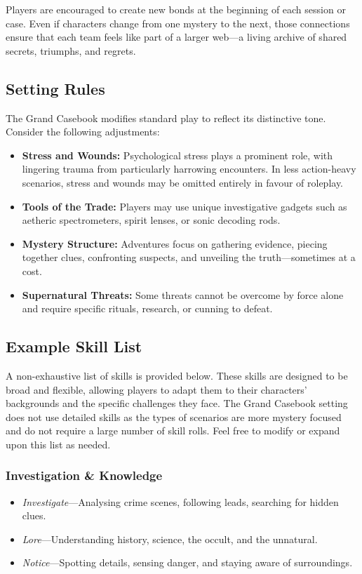 Players are encouraged to create new bonds at the beginning of each session or case. Even if characters change from one mystery to the next, those connections ensure that each team feels like part of a larger web—a living archive of shared secrets, triumphs, and regrets.

\subsection{Setting Rules}

The Grand Casebook modifies standard play to reflect its distinctive tone. Consider the following adjustments:

\begin{itemize}\raggedright
    \item \textbf{Stress and Wounds:} Psychological stress plays a prominent role, with lingering trauma from particularly harrowing encounters. In less action-heavy scenarios, stress and wounds may be omitted entirely in favour of roleplay.
    
    \item \textbf{Tools of the Trade:} Players may use unique investigative gadgets such as aetheric spectrometers, spirit lenses, or sonic decoding rods.
    
    \item \textbf{Mystery Structure:} Adventures focus on gathering evidence, piecing together clues, confronting suspects, and unveiling the truth—sometimes at a cost.
    
    \item \textbf{Supernatural Threats:} Some threats cannot be overcome by force alone and require specific rituals, research, or cunning to defeat.
\end{itemize}

\subsection{Example Skill List}

A non-exhaustive list of skills is provided below. These skills are designed to be broad and flexible, allowing players to adapt them to their characters' backgrounds and the specific challenges they face. The Grand Casebook setting does not use detailed skills as the types of scenarios are more mystery focused and do not require a large number of skill rolls. Feel free to modify or expand upon this list as needed.

\subsubsection*{Investigation \& Knowledge}  
\begin{itemize}\raggedright
    \item \emph{Investigate}---Analysing crime scenes, following leads, searching for hidden clues.
    \item \emph{Lore}---Understanding history, science, the occult, and the unnatural.
    \item \emph{Notice}---Spotting details, sensing danger, and staying aware of surroundings.
\end{itemize}

